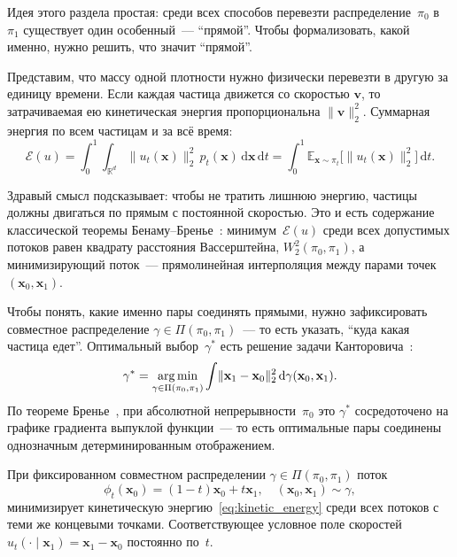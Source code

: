 Идея этого раздела простая: среди всех способов перевезти распределение~$\pi_0$ в~$\pi_1$ существует один особенный~--- ``прямой''. Чтобы формализовать, какой именно, нужно решить, что значит ``прямой''.

Представим, что массу одной плотности нужно физически перевезти в другую за единицу времени. Если каждая частица движется со скоростью $\mathbf{v}$, то затрачиваемая ею кинетическая энергия пропорциональна $\|\mathbf{v}\|_2^2$. Суммарная энергия по всем частицам и за всё время:
\begin{equation}
    \mathcal{E}(u) = \int_0^1 \int_{\mathbb{R}^d} \lVert u_t(\mathbf{x})\rVert_2^2\, p_t(\mathbf{x})\,\mathrm{d}\mathbf{x}\,\mathrm{d}t
    = \int_0^1 \mathbb{E}_{\mathbf{x}\sim\pi_t}\bigl[\lVert u_t(\mathbf{x})\rVert_2^2\bigr]\,\mathrm{d}t.
    \label{eq:kinetic_energy}
\end{equation}

Здравый смысл подсказывает: чтобы не тратить лишнюю энергию, частицы должны двигаться по прямым с постоянной скоростью. Это и есть содержание классической теоремы Бенаму--Бренье~\cite{benamou2000computational}: минимум~$\mathcal{E}(u)$ среди всех допустимых потоков равен квадрату расстояния Вассерштейна, $W_2^2(\pi_0,\pi_1)$, а минимизирующий поток~--- прямолинейная интерполяция между парами точек~$(\mathbf{x}_0,\mathbf{x}_1)$.

Чтобы понять, какие именно пары соединять прямыми, нужно зафиксировать совместное распределение $\gamma\in\Pi(\pi_0,\pi_1)$~--- то есть указать, ``куда какая частица едет''. Оптимальный выбор~$\gamma^*$ есть решение задачи Канторовича~\cite{kantorovich1942translocation}:
\[
    \gamma^* = \operatorname*{arg\,min}_{\gamma\in\Pi(\pi_0,\pi_1)}\int \lVert \mathbf{x}_1-\mathbf{x}_0\rVert_2^2\,\mathrm{d}\gamma(\mathbf{x}_0,\mathbf{x}_1).
\]
По теореме Бренье~\cite{brenier1991polar}, при абсолютной непрерывности~$\pi_0$ это $\gamma^*$ сосредоточено на графике градиента выпуклой функции~--- то есть оптимальные пары соединены однозначным детерминированным отображением.

\begin{proposition}
\label{prop:linear_opt}
При фиксированном совместном распределении $\gamma\in\Pi(\pi_0,\pi_1)$ поток
\[
    \phi_t(\mathbf{x}_0) = (1-t)\mathbf{x}_0 + t\mathbf{x}_1, \quad (\mathbf{x}_0,\mathbf{x}_1)\sim\gamma,
\]
минимизирует кинетическую энергию~\eqref{eq:kinetic_energy} среди всех потоков с теми же концевыми точками. Соответствующее условное поле скоростей~$u_t(\cdot\mid\mathbf{x}_1)=\mathbf{x}_1-\mathbf{x}_0$ постоянно по~$t$.
\end{proposition}

